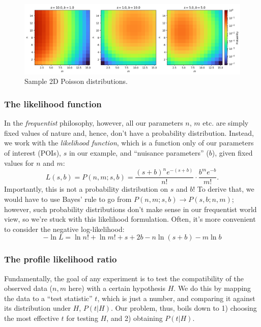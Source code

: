 \begin{figure}[htb]
    \centering
    \captionsetup{justification=centering}
    \includegraphics[width=\textwidth]{figures/03-Stats/01-intro/1.png}
    \caption{Sample 2D Poisson distributions.}
    \label{fig:03_pois}
\end{figure}

\subsubsection{The likelihood function}

In the \textit{frequentist} philosophy, however, all our parameters $n$, $m$ etc. are simply fixed values of nature and, hence, don't have a probability distribution.
Instead, we work with the \textit{likelihood function}, which is a function only of our parameters of interest (POIs), $s$ in our example, and ``nuisance parameters'' ($b$), given fixed values for $n$ and $m$:
\begin{equation}
\label{eq:03_likelihood}
L(s, b) = P(n, m; s, b) = \frac{(s+b)^n e^{-(s+b)}}{n!} \cdot \frac{b^m e^{-b}}{m!}.
\end{equation}
Importantly, this is not a probability distribution on $s$ and $b$! To derive that, we would have to use Bayes' rule to go from $P(n, m; s, b) \to P(s, b; n, m)$; however, such probability distributions don't make sense in our frequentist world view, so we're stuck with this likelihood formulation.
Often, it's more convenient to consider the negative log-likelihood:
\begin{equation}
\label{eq:03_nll}
-\ln L = \ln n! + \ln m! + s + 2b - n\ln(s+b) - m \ln b
\end{equation}

\subsubsection{The profile likelihood ratio}

Fundamentally, the goal of any experiment is to test the compatibility of the observed data ($n, m$ here) with a certain hypothesis $H$.
We do this by mapping the data to a ``test statistic'' $t$, which is just a number, and comparing it against its distribution under $H$, $P(t| H)$.
Our problem, thus, boils down to 1) choosing the most effective $t$ for testing $H$, and 2) obtaining $P(t| H)$.

